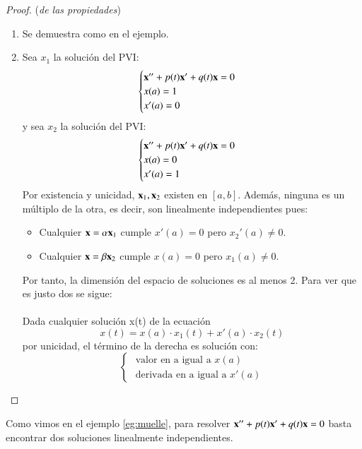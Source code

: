 \begin{proof} (\textit{de las propiedades})\\
    \begin{enumerate}
        \item Se demuestra como en el ejemplo.
        \item Sea $x_1$ la solución del PVI:
        $$
        \begin{cases}
            \mathbf{x}'' + p(t) \mathbf{x}' + q(t) \mathbf{x} = 0\\
            x(a) = 1\\
            x'(a) = 0
        \end{cases}
        $$
        y sea $x_2$ la solución del PVI:
        $$
        \begin{cases}
            \mathbf{x}'' + p(t) \mathbf{x}' + q(t) \mathbf{x} = 0\\
            x(a) = 0\\
            x'(a) = 1
        \end{cases}
        $$
        Por existencia y unicidad, $\mathbf{x}_1, \mathbf{x}_2$ existen en $[a,b]$. Además, ninguna es un múltiplo de la otra, es decir, son linealmente independientes pues:
        \begin{itemize}
            \item Cualquier $\mathbf{x} = \alpha \mathbf{x}_1$ cumple $x'(a) = 0$ pero $x_2'(a) \neq 0$.
            \item Cualquier $\mathbf{x} = \beta \mathbf{x}_2$ cumple $x(a) = 0$ pero $x_1(a) \neq 0$.
        \end{itemize}
        Por tanto, la dimensión del espacio de soluciones es al menos 2. Para ver que es justo dos se sigue:\\\\
        Dada cualquier solución x(t) de la ecuación
        $$
            x(t) = x(a) \cdot x_1(t) + x'(a) \cdot x_2(t)
        $$ %
        por unicidad, el término de la derecha es solución con:
        $$
            \begin{cases}
                \text{ valor en a igual a $x(a)$}\\
                \text{ derivada en a igual a $x'(a)$}
            \end{cases}
        $$
    \end{enumerate}
\end{proof}

\begin{obs}
    Como vimos en el ejemplo \ref{eg:muelle}, para resolver $\mathbf{x}'' + p(t) \mathbf{x}' + q(t) \mathbf{x} = 0$ basta encontrar dos soluciones linealmente independientes.
\end{obs}

